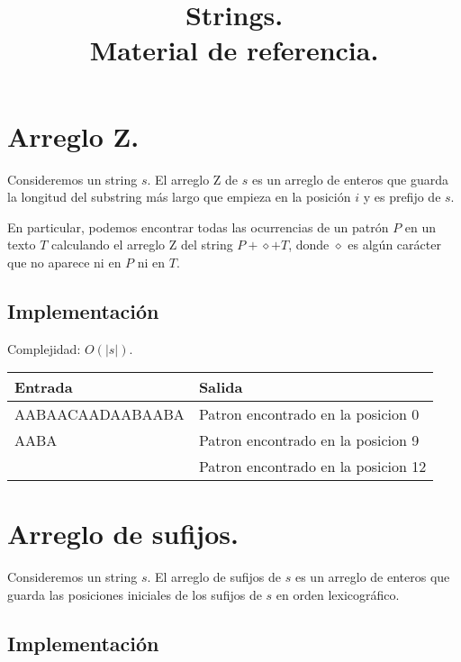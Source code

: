 \documentclass[12pt, letterpaper, twoside]{article}
\title{Strings.\\
	  \large Material de referencia.}
\author{}
\date{}
\begin{document}
\maketitle

\tableofcontents

\newpage

\section{Arreglo Z.}

Consideremos un string $s$. El arreglo Z de $s$ es un arreglo de enteros que guarda la longitud del substring más largo que empieza en la posición $i$ y es prefijo de $s$. 

En particular, podemos encontrar todas las ocurrencias de un patrón $P$ en un texto $T$ calculando el arreglo Z del string $P + \diamond + T$, donde $\diamond$ es algún carácter que no aparece ni en $P$ ni en $T$.

\subsection{Implementación}

Complejidad: $O(|s|)$.

 \medskip

\begin{tabular}{|p{7cm}|p{7cm}|}
\hline
\textbf{Entrada} & \textbf{Salida}\\ \hline
AABAACAADAABAABA & Patron encontrado en la posicion 0\\
AABA             & Patron encontrado en la posicion 9\\
                 & Patron encontrado en la posicion 12\\ \hline
\end{tabular}

\newpage

\section{Arreglo de sufijos.}

Consideremos un string $s$. El arreglo de sufijos de $s$ es un arreglo de enteros que guarda las posiciones iniciales de los sufijos de $s$ en orden lexicográfico.

\subsection{Implementación}
\end{document}
